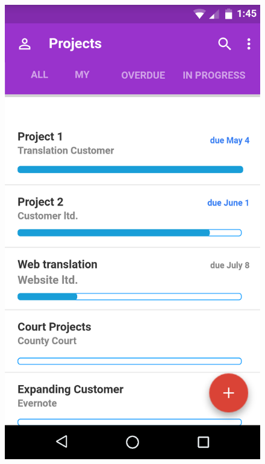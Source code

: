 \begin{figure}[]
	\centering
	\begin{minipage}{.5\textwidth}
		\centering
		\includegraphics[width=.74\linewidth]{pics/protoProjects}


\end{minipage}
\end{figure}
